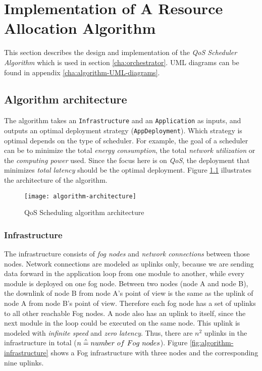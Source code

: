 \chapter{Implementation of A Resource Allocation Algorithm\label{cha:algorithm}}

This section describes the design and implementation of the \textit{QoS Scheduler Algorithm} which is used in section \ref{cha:orchestrator}. UML diagrams can be found in appendix \ref{cha:algorithm-UML-diagrams}.

\section{Algorithm architecture}

The algorithm takes an \texttt{Infrastructure} and an \texttt{Application} as inputs, and outputs an optimal deployment strategy (\texttt{AppDeployment}).
Which strategy is optimal depends on the type of scheduler.
For example, the goal of a scheduler can be to minimize the total \textit{energy consumption}, the total \textit{network utilization} or the \textit{computing power} used.
Since the focus here is on \textit{QoS}, the deployment that minimizes \textit{total latency} should be the optimal deployment.
Figure \ref{fig:algorithm-architecture} illustrates the architecture of the algorithm.

\begin{figure}[h]
    \centering
    \texttt{[image: algorithm-architecture]}
    \caption{QoS Scheduling algorithm architecture}
    \label{fig:algorithm-architecture}
\end{figure}


\subsection{Infrastructure\label{sec:algorithm-infrastructure}}

The infrastructure consists of \textit{fog nodes} and \textit{network connections} between those nodes. Network connections are modeled as uplinks only, because we are sending data forward in the application loop from one module to another, while every module is deployed on one fog node.
Between two nodes (node A and node B), the downlink of node B from node A's point of view is the same as the uplink of node A from node B's point of view. Therefore each fog node has a set of uplinks to all other reachable Fog nodes.
A node also has an uplink to itself, since the next module in the loop could be executed on the same node. This uplink is modeled with \textit{infinite speed} and \textit{zero latency}.
Thus, there are \(n^2\) uplinks in the infrastructure in total ($n \overset{\scriptscriptstyle\wedge}{=} number\ of\ Fog\ nodes$).
Figure \ref{fig:algorithm-infrastructure} shows a Fog infrastructure with three nodes and the corresponding nine uplinks.

